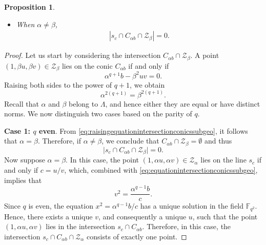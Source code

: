 \documentclass[11pt]{article}
\newtheorem{prop}[theorem]{Proposition}
\theoremstyle{definition}
\numberwithin{equation}{section}
\def\cZ{\mathcal Z}
\def\F{{\mathbb F}}
\begin{document}
\begin{prop}
\begin{itemize}
    \item When $\alpha \neq \beta$,
    \begin{align*}
        |s_c \cap C_{\alpha b} \cap \cZ_{\beta}| = 0. 
    \end{align*}
\end{itemize}
\end{prop}
\begin{proof}
Let us start by considering the intersection $C_{\alpha b} \cap \mathcal{Z}_\beta$.
A point $(1, \beta u, \beta v) \in \mathcal{Z}_\beta$ lies on the conic $C_{\alpha b}$ if and only if
\begin{equation} \label{eq:equationintersectionconicssubgeo}
    \alpha^{q+1}b-\beta^2uv=0.
\end{equation}
Raising both sides to the power of $q+1$, we obtain
\begin{equation} \label{eq:raisingequationintersectionconicssubgeo}
    \alpha^{2(q+1)}=\beta^{2(q+1)}.
\end{equation}
Recall that $\alpha$ and $\beta$ belong to $\Lambda$, and hence either they are equal or have distinct norms. We now distinguish two cases based on the parity of $q$.

\textbf{Case 1: $q$ even}. 
From \eqref{eq:raisingequationintersectionconicssubgeo}, it follows that $\alpha = \beta$. Therefore, if $\alpha \ne \beta$, we conclude that $C_{\alpha b} \cap \cZ_{\beta}= \emptyset$ and thus
\[
\lvert s_c \cap C_{\alpha b} \cap \cZ_{\beta} \rvert=0.
\]
Now suppose $\alpha = \beta$. In this case, the point $(1, \alpha u, \alpha v) \in \mathcal{Z}_\alpha$ lies on the line $s_c$ if and only if $c = u/v$, which, combined with \eqref{eq:equationintersectionconicssubgeo}, implies that
\[
v^2=\frac{\alpha^{q-1}b}c.
\]
Since $q$ is even, the equation $x^2 = \alpha^{q-1}b/c$ has a unique solution in the field $\F_{q^2}$.
Hence, there exists a unique $v$, and consequently a unique $u$, such that the point $(1, \alpha u, \alpha v)$ lies in the intersection $s_c \cap C_{\alpha b}$.
Therefore, in this case, the intersection $s_c \cap C_{\alpha b} \cap \mathcal{Z}_\alpha$ consists of exactly one point. 


\end{proof}
\end{document}
